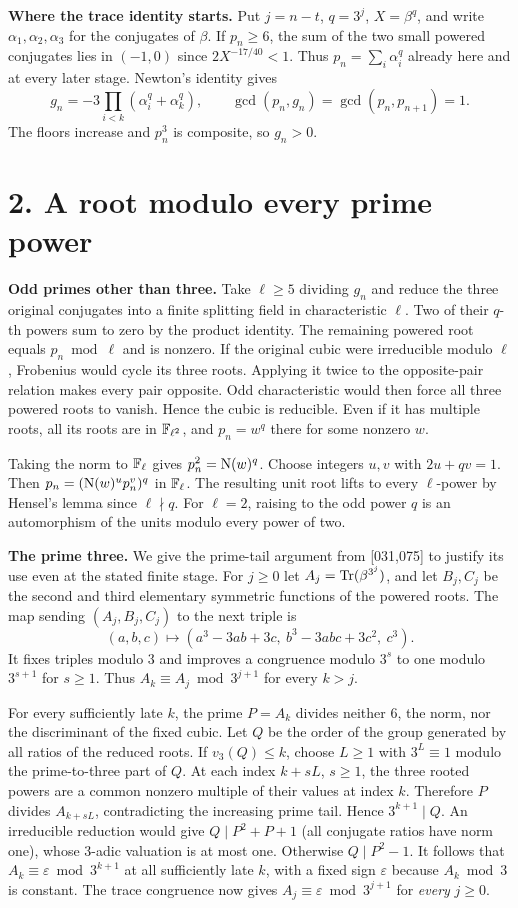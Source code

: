 \documentclass[11pt,a4paper,oneside,openany]{book}
\newcommand{\sub}[1]{\par\medskip\textbf{#1}\enspace}
\newcommand{\localhead}[1]{\needspace{5\baselineskip}\section*{\color{ink}#1}}
\let\sect\localhead\let\secx\localhead\let\head\localhead
\begin{document}
\sub{Where the trace identity starts.}
Put $j=n-t$, $q=3^j$, $X=\beta^q$, and write $\alpha_1,\alpha_2,\alpha_3$ for the conjugates of $\beta$. If $p_n\ge6$, the sum of the two small powered conjugates lies in $(-1,0)$ since $2X^{-17/40}<1$. Thus $p_n=\sum_i\alpha_i^q$ already here and at every later stage. Newton's identity gives
\[
 g_n=-3\prod_{i<k}(\alpha_i^q+\alpha_k^q),\qquad
 \gcd(p_n,g_n)=\gcd(p_n,p_{n+1})=1 .
\]
The floors increase and $p_n^3$ is composite, so $g_n>0$.



\sect{2. A root modulo every prime power}
\sub{Odd primes other than three.}
Take $\ell\ge5$ dividing $g_n$ and reduce the three original conjugates into a finite splitting field in characteristic $\ell$. Two of their $q$-th powers sum to zero by the product identity. The remaining powered root equals $p_n\bmod\ell$ and is nonzero. If the original cubic were irreducible modulo $\ell$, Frobenius would cycle its three roots. Applying it twice to the opposite-pair relation makes every pair opposite. Odd characteristic would then force all three powered roots to vanish. Hence the cubic is reducible. Even if it has multiple roots, all its roots are in $\mathbb F_{\ell^2}$, and $p_n=w^q$ there for some nonzero $w$.

Taking the norm to $\mathbb F_\ell$ gives $p_n^2=\operatorname{N}(w)^q$. Choose integers $u,v$ with $2u+qv=1$. Then $p_n=(\operatorname{N}(w)^u p_n^v)^q$ in $\mathbb F_\ell$. The resulting unit root lifts to every $\ell$-power by Hensel's lemma since $\ell\nmid q$. For $\ell=2$, raising to the odd power $q$ is an automorphism of the units modulo every power of two.

\sub{The prime three.}
We give the prime-tail argument from [031,075] to justify its use even at the stated finite stage. For $j\ge0$ let $A_j=\operatorname{Tr}(\beta^{3^j})$, and let $B_j,C_j$ be the second and third elementary symmetric functions of the powered roots. The map sending $(A_j,B_j,C_j)$ to the next triple is
\[
 (a,b,c)\longmapsto(a^3-3ab+3c,\ b^3-3abc+3c^2,\ c^3).
\]
It fixes triples modulo $3$ and improves a congruence modulo $3^s$ to one modulo $3^{s+1}$ for $s\ge1$. Thus $A_k\equiv A_j\bmod 3^{j+1}$ for every $k>j$.

For every sufficiently late $k$, the prime $P=A_k$ divides neither $6$, the norm, nor the discriminant of the fixed cubic. Let $Q$ be the order of the group generated by all ratios of the reduced roots. If $v_3(Q)\le k$, choose $L\ge1$ with $3^L\equiv1$ modulo the prime-to-three part of $Q$. At each index $k+sL$, $s\ge1$, the three rooted powers are a common nonzero multiple of their values at index $k$. Therefore $P$ divides $A_{k+sL}$, contradicting the increasing prime tail. Hence $3^{k+1}\mid Q$. An irreducible reduction would give $Q\mid P^2+P+1$ (all conjugate ratios have norm one), whose $3$-adic valuation is at most one. Otherwise $Q\mid P^2-1$. It follows that $A_k\equiv\varepsilon\bmod 3^{k+1}$ at all sufficiently late $k$, with a fixed sign $\varepsilon$ because $A_k\bmod3$ is constant. The trace congruence now gives $A_j\equiv\varepsilon\bmod 3^{j+1}$ for \emph{every} $j\ge0$.
\end{document}
